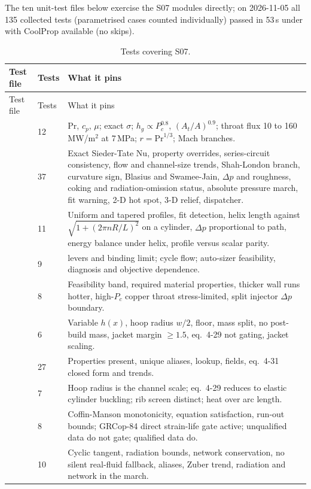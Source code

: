 The ten unit-test files below exercise the S07 modules directly; on 2026-11-05 all 135 collected tests (parametrised cases counted individually) passed in 53\,s under  with CoolProp available (no skips).

{\footnotesize
\begin{longtable}{P{4.4cm}P{0.8cm}P{10.4cm}}
\caption{Tests covering S07.}\label{tab:s07-tests}\\
\toprule
Test file & Tests & What it pins\\
\midrule
\endfirsthead
\toprule
Test file & Tests & What it pins\\
\midrule
\endhead
{} & 12 & Pr, $c_p$, $\mu$; exact $\sigma$; $h_g \propto P_c^{0.8}$, $(A_t/A)^{0.9}$; throat flux 10 to 160\,MW/m$^2$ at 7\,MPa; $r = \mathrm{Pr}^{1/3}$; Mach branches.\\
 & 37 & Exact Sieder-Tate Nu, property overrides, series-circuit consistency, flow and channel-size trends, Shah-London branch, curvature sign, Blasius and Swamee-Jain, $\Delta p$ and roughness, coking and radiation-omission status, absolute pressure march, fit warning, 2-D hot spot, 3-D relief, dispatcher.\\
 & 11 & Uniform and tapered profiles, fit detection, helix length against $\sqrt{1+(2\pi nR/L)^2}$ on a cylinder, $\Delta p$ proportional to path, energy balance under helix, profile versus scalar parity.\\
 & 9 &  levers and binding limit; cycle flow; auto-sizer feasibility, diagnosis and objective dependence.\\
 & 8 & Feasibility band, required material properties, thicker wall runs hotter, high-$P_c$ copper throat stress-limited, split injector $\Delta p$ boundary.\\
 & 6 & Variable $h(x)$, hoop radius $w/2$, floor, mass split, no post-build mass, jacket margin $\geq 1.5$, eq.\ 4-29 not gating, jacket scaling.\\
 & 27 & Properties present, unique aliases, lookup,  fields, eq.\ 4-31 closed form and trends.\\
 & 7 & Hoop radius is the channel scale; eq.\ 4-29 reduces to elastic cylinder buckling; rib screen distinct; heat over arc length.\\
 & 8 & Coffin-Manson monotonicity, equation satisfaction, run-out bounds; GRCop-84 direct strain-life gate active; unqualified data do not gate; qualified data do.\\
 & 10 & Cyclic tangent, radiation bounds, network conservation, no silent real-fluid fallback, aliases, Zuber trend, radiation and network in the march.\\
\bottomrule
\end{longtable}
}


